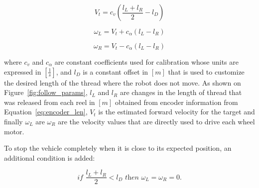 \documentclass[journal]{IEEEtran}
\begin{document}
\begin{equation}
V_t = c_v (\frac{l_L + l_R}{2} - l_D)
\label{eq:lemniscata}
\end{equation}

\begin{equation}
\omega_{L} = V_t + c_{\alpha} (l_L - l_R)
\label{eq:lemniscata2}
\end{equation}

\begin{equation}
\omega_{R} = V_t - c_{\alpha} (l_L - l_R)
\label{eq:lemniscata3}
\end{equation}

\noindent where  $c_v$ and $c_{\alpha}$ are constant coefficients used for calibration whose units are expressed in $[\frac{1}{s}]$, and $l_D$ is a constant offset in $[m]$ that is used to customize the desired length of the thread where the robot does not move.   As shown on Figure~\ref{fig:follow_params},  $l_L$ and $l_R$ are changes in the length of thread that was released from each reel in $[m]$  obtained from encoder information from Equation~\ref{eq:encoder_len}, $V_t$ is the estimated forward velocity for the target and finally $\omega_{L}$ are $\omega_{R}$ are the velocity values that are directly used to drive each wheel motor.

To stop the vehicle completely when it is close to its expected position, an additional condition is added: 

\begin{equation}
\textit{if  }{\frac{l_L + l_R}{2} < l_D}\textit{ then } \omega_{L} = \omega_{R} = 0.
\end{equation}
\end{document}
